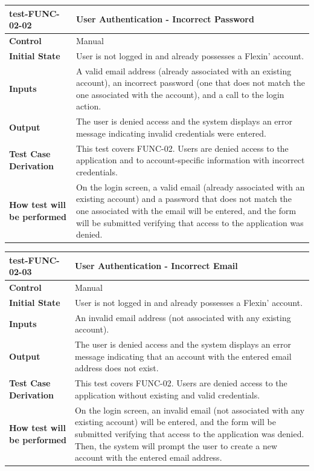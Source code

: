 \documentclass[12pt, titlepage]{article}
\begin{document}
\vspace{1em}

\noindent\begin{tabularx}{\textwidth}{>{\raggedright\arraybackslash}p{3.5cm}X}
  \toprule
  \textbf{test-FUNC-02-02} & \textbf{User Authentication - Incorrect Password}\\
  \midrule
  \textbf{Control} & Manual\\
  \textbf{Initial State} & User is not logged in and already possesses a Flexin' account.\\
  \textbf{Inputs} & A valid email address (already associated with an existing account), an incorrect password (one that does not match the one associated with the account), and a call to the login action.\\
  \textbf{Output} & The user is denied access and the system displays an error message indicating invalid credentials were entered.\\
  \textbf{Test Case Derivation} & This test covers FUNC-02. Users are denied access to the application and to account-specific information with incorrect credentials.\\
  \textbf{How test will be performed} & On the login screen, a valid email (already associated with an existing account) and a password that does not match the one associated with the email will be entered, and the form will be submitted verifying that access to the application was denied.\\
  \bottomrule
\end{tabularx}

\vspace{1em}

\noindent\begin{tabularx}{\textwidth}{>{\raggedright\arraybackslash}p{3.5cm}X}
  \toprule
  \textbf{test-FUNC-02-03} & \textbf{User Authentication - Incorrect Email}\\
  \midrule
  \textbf{Control} & Manual\\
  \textbf{Initial State} & User is not logged in and already possesses a Flexin' account.\\
  \textbf{Inputs} & An invalid email address (not associated with any existing account).\\
  \textbf{Output} & The user is denied access and the system displays an error message indicating that an account with the entered email address does not exist.\\
  \textbf{Test Case Derivation} & This test covers FUNC-02. Users are denied access to the application without existing and valid credentials.\\
  \textbf{How test will be performed} & On the login screen, an invalid email (not associated with any existing account) will be entered, and the form will be submitted verifying that access to the application was denied. Then, the system will prompt the user to create a new account with the entered email address.\\
  \bottomrule
\end{tabularx}
\end{document}
